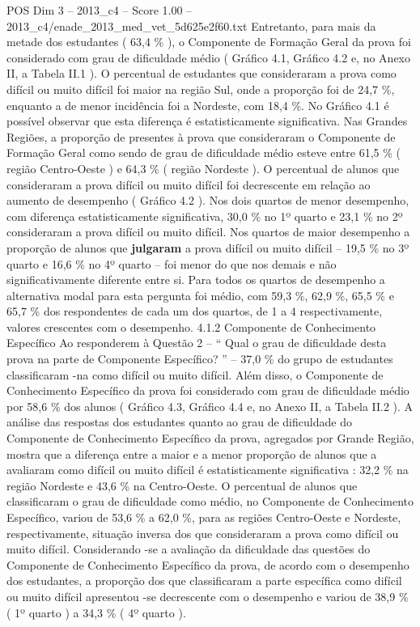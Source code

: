 \begin{textsample}{POS Dim 3 – 2013\_c4 – Score 1.00 – 2013\_c4/enade\_2013\_med\_vet\_5d625e2f60.txt}
Entretanto, para mais da metade dos estudantes ( 63,4 \% ), o Componente de Formação Geral da prova foi considerado com grau de dificuldade médio ( Gráfico 4.1, Gráfico 4.2 e, no Anexo II, a Tabela II.1 ).
O percentual de estudantes que consideraram a prova como difícil ou muito difícil foi maior na região Sul, onde a proporção foi de 24,7 \%, enquanto a de menor incidência foi a Nordeste, com 18,4 \%.
No Gráfico 4.1 é possível observar que esta diferença é estatisticamente significativa.
Nas Grandes Regiões, a proporção de presentes à prova que consideraram o Componente de Formação Geral como sendo de grau de dificuldade médio esteve entre 61,5 \% ( região Centro-Oeste ) e 64,3 \% ( região Nordeste ).
O percentual de alunos que consideraram a prova difícil ou muito difícil foi decrescente em relação ao aumento de desempenho ( Gráfico 4.2 ).
Nos dois quartos de menor desempenho, com diferença estatisticamente significativa, 30,0 \% no 1º quarto e 23,1 \% no 2º consideraram a prova difícil ou muito difícil.
Nos quartos de maior desempenho a proporção de alunos que \textbf{julgaram} a prova difícil ou muito difícil – 19,5 \% no 3º quarto e 16,6 \% no 4º quarto – foi menor do que nos demais e não significativamente diferente entre si.
Para todos os quartos de desempenho a alternativa modal para esta pergunta foi médio, com 59,3 \%, 62,9 \%, 65,5 \% e 65,7 \% dos respondentes de cada um dos quartos, de 1 a 4 respectivamente, valores crescentes com o desempenho. 4.1.2 Componente de Conhecimento Específico Ao responderem à Questão 2 – “ Qual o grau de dificuldade desta prova na parte de Componente Específico? ” – 37,0 \% do grupo de estudantes classificaram -na como difícil ou muito difícil.
Além disso, o Componente de Conhecimento Específico da prova foi considerado com grau de dificuldade médio por 58,6 \% dos alunos ( Gráfico 4.3, Gráfico 4.4 e, no Anexo II, a Tabela II.2 ).
A análise das respostas dos estudantes quanto ao grau de dificuldade do Componente de Conhecimento Específico da prova, agregados por Grande Região, mostra que a diferença entre a maior e a menor proporção de alunos que a avaliaram como difícil ou muito difícil é estatisticamente significativa : 32,2 \% na região Nordeste e 43,6 \% na Centro-Oeste.
O percentual de alunos que classificaram o grau de dificuldade como médio, no Componente de Conhecimento Específico, variou de 53,6 \% a 62,0 \%, para as regiões Centro-Oeste e Nordeste, respectivamente, situação inversa dos que consideraram a prova como difícil ou muito difícil.
Considerando -se a avaliação da dificuldade das questões do Componente de Conhecimento Específico da prova, de acordo com o desempenho dos estudantes, a proporção dos que classificaram a parte específica como difícil ou muito difícil apresentou -se decrescente com o desempenho e variou de 38,9 \% ( 1º quarto ) a 34,3 \% ( 4º quarto ).

\end{textsample}
